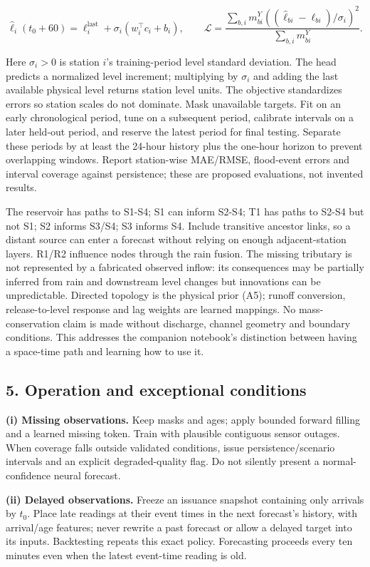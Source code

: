 \documentclass[
  10pt,
  a4paper,
]{article}
\begin{document}
\[\widehat\ell_i(t_0+60)=\ell_i^{\mathrm{last}}+\sigma_i(w_i^\top c_i+b_i),\qquad \mathcal L=\frac{\sum_{b,i}m^Y_{bi}\left((\widehat\ell_{bi}-\ell_{bi})/\sigma_i\right)^2}{\sum_{b,i}m^Y_{bi}}.\]

Here \(\sigma_i>0\) is station \(i\)'s training-period level standard
deviation. The head predicts a normalized level increment; multiplying
by \(\sigma_i\) and adding the last available physical level returns
station level units. The objective standardizes errors so station scales
do not dominate. Mask unavailable targets. Fit on an early chronological
period, tune on a subsequent period, calibrate intervals on a later
held-out period, and reserve the latest period for final testing.
Separate these periods by at least the 24-hour history plus the one-hour
horizon to prevent overlapping windows. Report station-wise MAE/RMSE,
flood-event errors and interval coverage against persistence; these are
proposed evaluations, not invented results.

The reservoir has paths to S1-S4; S1 can inform S2-S4; T1 has paths to
S2-S4 but not S1; S2 informs S3/S4; S3 informs S4. Include transitive
ancestor links, so a distant source can enter a forecast without relying
on enough adjacent-station layers. R1/R2 influence nodes through the
rain fusion. The missing tributary is not represented by a fabricated
observed inflow: its consequences may be partially inferred from rain
and downstream level changes but innovations can be unpredictable.
Directed topology is the physical prior (A5); runoff conversion,
release-to-level response and lag weights are learned mappings. No
mass-conservation claim is made without discharge, channel geometry and
boundary conditions. This addresses the companion notebook's distinction
between having a space-time path and learning how to use it.

\subsection{5. Operation and exceptional
conditions}\label{operation-and-exceptional-conditions}

\textbf{(i) Missing observations.} Keep masks and ages; apply bounded
forward filling and a learned missing token. Train with plausible
contiguous sensor outages. When coverage falls outside validated
conditions, issue persistence/scenario intervals and an explicit
degraded-quality flag. Do not silently present a normal-confidence
neural forecast.

\textbf{(ii) Delayed observations.} Freeze an issuance snapshot
containing only arrivals by \(t_0\). Place late readings at their event
times in the next forecast's history, with arrival/age features; never
rewrite a past forecast or allow a delayed target into its inputs.
Backtesting repeats this exact policy. Forecasting proceeds every ten
minutes even when the latest event-time reading is old.
\end{document}
